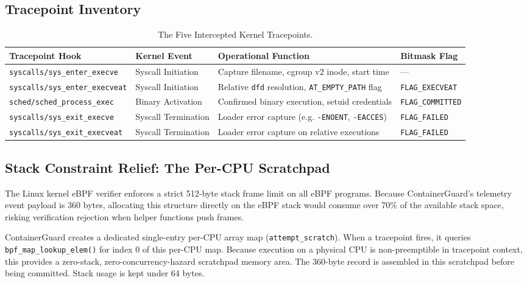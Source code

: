 \documentclass[11pt,a4paper]{article}
\begin{document}
\subsection{Tracepoint Inventory}
\begin{table}[htbp]
\centering
\small
\begin{tabularx}{\textwidth}{l p{3.2cm} X l}
\toprule
\textbf{Tracepoint Hook} & \textbf{Kernel Event} & \textbf{Operational Function} & \textbf{Bitmask Flag} \\
\midrule
\texttt{syscalls/sys\_enter\_execve} & Syscall Initiation & Capture filename, cgroup v2 inode, start time & --- \\
\texttt{syscalls/sys\_enter\_execveat} & Syscall Initiation & Relative \texttt{dfd} resolution, \texttt{AT\_EMPTY\_PATH} flag & \texttt{FLAG\_EXECVEAT} \\
\texttt{sched/sched\_process\_exec} & Binary Activation & Confirmed binary execution, setuid credentials & \texttt{FLAG\_COMMITTED} \\
\texttt{syscalls/sys\_exit\_execve} & Syscall Termination & Loader error capture (e.g. \texttt{-ENOENT}, \texttt{-EACCES}) & \texttt{FLAG\_FAILED} \\
\texttt{syscalls/sys\_exit\_execveat} & Syscall Termination & Loader error capture on relative executions & \texttt{FLAG\_FAILED} \\
\bottomrule
\end{tabularx}
\caption{The Five Intercepted Kernel Tracepoints.}
\label{tab:tracepoints}
\end{table}

\subsection{Stack Constraint Relief: The Per-CPU Scratchpad}
The Linux kernel eBPF verifier enforces a strict 512-byte stack frame limit on all eBPF programs. 
Because ContainerGuard's telemetry event payload is 360 bytes, allocating this structure directly on the eBPF stack would consume over 70\% of the available stack space, risking verification rejection when helper functions push frames.

\begin{kernelbox}
ContainerGuard creates a dedicated single-entry per-CPU array map (\texttt{attempt\_scratch}). 
When a tracepoint fires, it queries \texttt{bpf\_map\_lookup\_elem()} for index 0 of this per-CPU map. 
Because execution on a physical CPU is non-preemptible in tracepoint context, this provides a zero-stack, zero-concurrency-hazard scratchpad memory area. The 360-byte record is assembled in this scratchpad before being committed. Stack usage is kept under 64 bytes.
\end{kernelbox}
\end{document}
